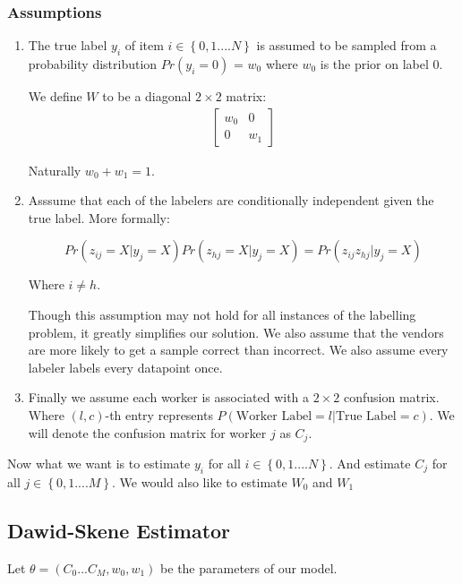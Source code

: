 \subsubsection{Assumptions}
\begin{enumerate}
\item
The true label $y_{i}$ of item
$i \in \left\{0,1....N\right\} $ is assumed to be sampled from a probability
distribution $Pr(y_{i} = 0)$ = $w_{0}$ where $w_{0}$ is the prior on label 0.

We define $W$ to be a diagonal $2 \times 2$ matrix:
\begin{align}
\begin{bmatrix}
w_{0} & 0 \\
0     & w_{1}
\end{bmatrix}
\end{align}

Naturally $w_{0} + w_{1} = 1$. \\

\item
Asssume that each of the labelers are conditionally independent given the true label. More formally:

$$Pr(z_{ij} = X | y_{j} = X)Pr(z_{hj} = X | y_{j} = X) = Pr(z_{ij}z_{hj} | y_{j} = X)$$

Where $i \neq h$.

Though this assumption may not hold for all instances of the labelling problem, it greatly simplifies our solution. We also assume that the vendors are more likely to get a sample correct than incorrect. We also assume every labeler labels every datapoint once.

\item
Finally we assume each worker is associated with a $2 \times 2$ confusion matrix. Where $(l,c)$-th entry represents $P(\text{Worker Label} = l| \text{True Label} = c)$. We will denote the confusion matrix for worker $j$ as  $C_{j}$.

\end{enumerate}

Now what we want is to estimate $y_{i}$ for all $i \in \left\{0,1....N\right\}$. And estimate $C_{j}$ for all $j \in \left\{0,1....M\right\}$. 
We would also like to estimate $W_{0}$ and $W_{1}$

\subsection{Dawid-Skene Estimator}
Let $\theta = (C_{0}...C_{M},w_{0},w_{1})$ be the parameters of our model.

